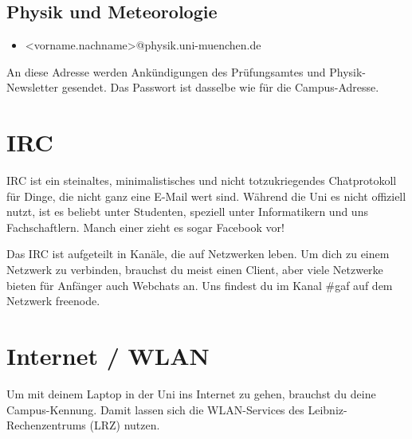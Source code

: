 \begin{urlList}
\end{urlList}

\subsection*{Physik und Meteorologie\subjectList{\subjectP}}
\begin{itemize}
	\item[]<vorname.nachname>@physik.uni-muenchen.de
\end{itemize}
An diese Adresse werden Ankündigungen des Prüfungsamtes und Physik-Newsletter gesendet.
Das Passwort ist dasselbe wie für die Campus-Adresse.

\begin{urlList}
\end{urlList}

\section{IRC}
IRC ist ein steinaltes, minimalistisches und nicht totzukriegendes
Chatprotokoll für Dinge, die nicht ganz eine E-Mail wert sind. Während die Uni
es nicht offiziell nutzt, ist es beliebt unter Studenten, speziell unter
Informatikern und uns Fachschaftlern. Manch einer zieht es sogar Facebook vor!

Das IRC ist aufgeteilt in Kanäle, die auf Netzwerken leben. Um dich zu einem
Netzwerk zu verbinden, brauchst du meist einen Client, aber viele Netzwerke
bieten für Anfänger auch Webchats an. Uns findest du im Kanal \#gaf auf dem
Netzwerk freenode.

\begin{urlList}
\end{urlList}



\section{Internet / WLAN}
Um mit deinem Laptop in der Uni ins Internet zu gehen, brauchst du
deine Campus-Kennung. Damit lassen sich die WLAN-Services des
Leibniz-Rechen\-zentrums (LRZ) nutzen.

